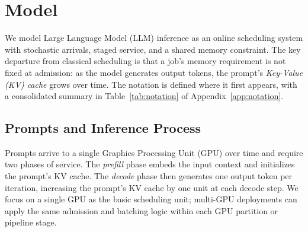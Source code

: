 \section{Model}
\label{sec:model}

We model Large Language Model (LLM) inference as an online scheduling system with stochastic arrivals, staged service, and a shared memory constraint. The key departure from classical scheduling is that a job's memory requirement is not fixed at admission: as the model generates output tokens, the prompt's \textit{Key-Value (KV) cache} grows over time. The notation is defined where it first appears, with a consolidated summary in Table~\ref{tab:notation} of Appendix~\ref{app:notation}.

\subsection{Prompts and Inference Process}

Prompts arrive to a single Graphics Processing Unit (GPU) over time and require two phases of service. The \textit{prefill} phase embeds the input context and initializes the prompt's KV cache. The \textit{decode} phase then generates one output token per iteration, increasing the prompt's KV cache by one unit at each decode step. We focus on a single GPU as the basic scheduling unit; multi-GPU deployments can apply the same admission and batching logic within each GPU partition or pipeline stage.




